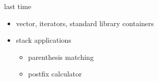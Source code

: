 \begin{comment}
\begin{frame}[fragile,label=lastTime]{last time}
    \begin{itemize}
    \item example with copy-constructor, destructor, etc.
        \begin{itemize}
        \item gotcha: {\tt Type foo;} versus {\tt Type foo();}
        \item \lstinline|friend ostream &operator<<(...)|
        \item copy-constructor use when passing object by value
        \item return value copy elision
        \end{itemize}
    \item started talking about vector --- C++ equivalent of \texttt{ArrayList}
    \end{itemize}
\end{frame}
\end{comment}

\begin{frame}[fragile,label=lastTime]{last time}
    \begin{itemize}
    \item vector, iterators, standard library containers
    \item stack applications
        \begin{itemize}
        \item parenthesis matching
        \item postfix calculator
        \end{itemize}
    \end{itemize}
\end{frame}
